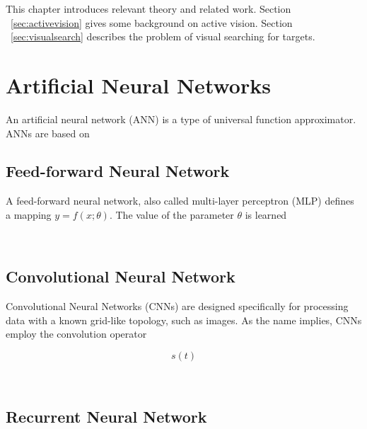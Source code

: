This chapter introduces relevant theory and related work.
Section ~\ref{sec:activevision} gives some background on active vision.
Section ~\ref{sec:visualsearch} describes the problem of visual searching for targets.



\section{Artificial Neural Networks}

An artificial neural network (ANN) is a type of universal function approximator.
ANNs are based on 


\subsection{Feed-forward Neural Network}

A feed-forward neural network, also called multi-layer perceptron (MLP) defines a mapping \(y = f(x; \theta)\).
The value of the parameter \(\theta\) is learned  

~\cite{goodfellow_deep_2016}

\subsection{Convolutional Neural Network}

Convolutional Neural Networks (CNNs) are designed specifically for processing data with a known grid-like topology, such as images.
As the name implies, CNNs employ the convolution operator

\[
    s(t) 
\]

~\cite{goodfellow_deep_2016}


\subsection{Recurrent Neural Network}

